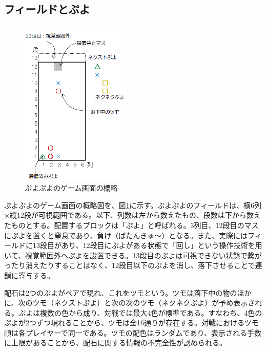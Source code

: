 \documentclass[12pt]{jarticle}
\begin{document}
\subsection{フィールドとぷよ} \label{field_puyo}
\begin{figure}[hbt]
  \begin{center}
  \includegraphics[height=8cm]{img/field.png}
  \caption{ぷよぷよのゲーム画面の概略} \label{fig:field}
\end{center}
\end{figure}

ぷよぷよのゲーム画面の概略図を、図\ref{fig:field}に示す。ぷよぷよのフィールドは、横6列$\times$縦12段が可視範囲である。以下、列数は左から数えたもの、段数は下から数えたものとする。配置するブロックは「ぷよ」と呼ばれる。3列目、12段目のマスにぷよを置くと窒息であり、負け（ばたんきゅ～）となる。また、実際にはフィールドに13段目があり、12段目にぷよがある状態で「回し」という操作技術を用いて、視覚範囲外へぷよを設置できる。13段目のぷよは可視できない状態で繋がったり消えたりすることはなく、12段目以下のぷよを消し、落下させることで連鎖に寄与する。

配石は2つのぷよがペアで現れ、これをツモという。ツモは落下中の物のほかに、次のツモ（ネクストぷよ）と次の次のツモ（ネクネクぷよ）が予め表示される。ぷよは複数の色から成り、対戦では最大4色が標準である。すなわち、4色のぷよが2つずつ現れることから、ツモは全16通りが存在する。対戦におけるツモ順は各プレイヤーで同一である。ツモの配色はランダムであり、表示される手数に上限があることから、配石に関する情報の不完全性が認められる。
\end{document}
